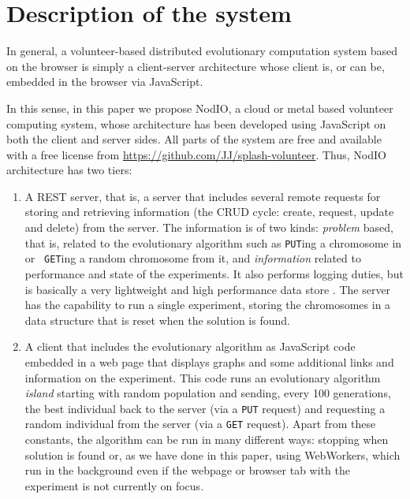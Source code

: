 \documentclass[journal,onecolumn]{IEEEtran}
\begin{document}
\section{Description of the system}
\label{sec:description}

In general, a volunteer-based distributed evolutionary computation
system based on the browser is simply a client-server architecture
whose client is, or can be, embedded in the browser via JavaScript. 

In this sense, in this paper we propose {\sf NodIO}, a cloud or metal based 
volunteer computing system, whose architecture
has been developed using JavaScript on both the client and server sides.
All parts of the system are free and available with a free
license from \url{https://github.com/JJ/splash-volunteer}.
Thus, {\sf NodIO} architecture has two tiers:\begin{enumerate}
\item A REST server, that is, a server that includes several remote %
  requests for storing and retrieving information (the CRUD cycle:
  create, request, update and delete) from the server. The information
  is of two kinds: {\em problem} based, that is, related to the
  evolutionary algorithm such as {\tt PUT}ing a chromosome in or {\tt
    GET}ing a random chromosome from it, and {\em information} related
  to performance and state of the experiments. It also performs logging
  duties, but is basically a very lightweight and high performance
  data store \cite{jj:idc:lowcost}. 
  The server has the capability to
  run a single experiment, storing the chromosomes in a data structure
  that is reset when the solution is found. 
\item A client that includes the evolutionary algorithm as 
  JavaScript code embedded in a web page that displays graphs and some
  additional links and information on the experiment. This code runs
  an evolutionary algorithm {\em island} starting with random
  population and sending, every 100 generations, the best individual
  back to the server (via a {\tt PUT} request) and requesting a random
  individual from the server (via a {\tt GET} request). Apart from
  these constants, the algorithm can be run in many different ways:
  stopping when solution is found or, as we have done in this paper,
  using WebWorkers, which run in the background even if the webpage or
  browser tab with the experiment is not currently on focus.  
\end{enumerate}
\end{document}
